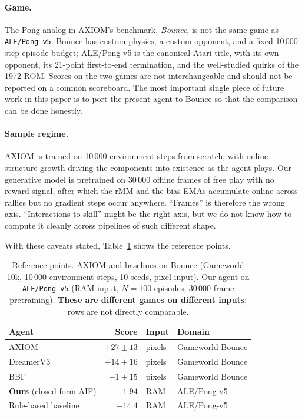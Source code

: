 \documentclass[runningheads]{llncs}
\begin{document}
\paragraph{Game.}
The Pong analog in AXIOM's benchmark, \emph{Bounce}, is not the
same game as \texttt{ALE/Pong-v5}. Bounce has custom physics, a
custom opponent, and a fixed 10\,000-step episode budget;
ALE/Pong-v5 is the canonical Atari title, with its own opponent,
its 21-point first-to-end termination, and the well-studied quirks
of the 1972 ROM. Scores on the two games are not interchangeable
and should not be reported on a common scoreboard. The most
important single piece of future work in this paper is to port the
present agent to Bounce so that the comparison can be done
honestly.

\paragraph{Sample regime.}
AXIOM is trained on 10\,000 environment steps from scratch, with
online structure growth driving the components into existence as
the agent plays. Our generative model is pretrained on 30\,000
offline frames of free play with no reward signal, after which the
rMM and the bias EMAs accumulate online across rallies but no
gradient steps occur anywhere. ``Frames'' is therefore the wrong
axis. ``Interactions-to-skill'' might be the right axis, but we
do not know how to compute it cleanly across pipelines of such
different shape.

With these caveats stated, Table~\ref{tab:axiom} shows the
reference points.

\begin{table}[t]
\caption{Reference points. AXIOM and baselines on Bounce
(Gameworld 10k, 10\,000 environment steps, 10 seeds, pixel
input). Our agent on \texttt{ALE/Pong-v5} (RAM input, $N{=}100$
episodes, 30\,000-frame pretraining). \textbf{These are different
games on different inputs}; rows are not directly
comparable.}\label{tab:axiom}
\centering
\begin{tabular}{lrll}
\toprule
Agent                                 & Score          & Input  & Domain           \\
\midrule
AXIOM                                 & $+27 \pm 13$   & pixels & Gameworld Bounce \\
DreamerV3                             & $+14 \pm 16$   & pixels & Gameworld Bounce \\
BBF                                   & $-1 \pm 15$    & pixels & Gameworld Bounce \\
\midrule
\textbf{Ours} (closed-form AIF)       & $+1.94$        & RAM    & ALE/Pong-v5      \\
Rule-based baseline                   & $-14.4$        & RAM    & ALE/Pong-v5      \\
\bottomrule
\end{tabular}
\end{table}
\end{document}
